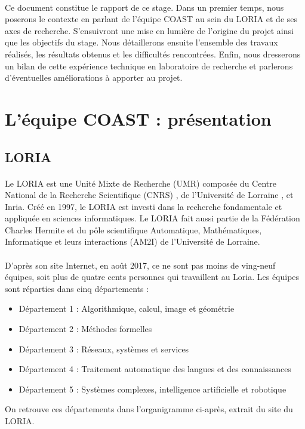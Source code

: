 \documentclass[12pt]{article}
\begin{document}
\paragraph{}
Ce document constitue le rapport de ce stage. Dans un premier temps, nous poserons le contexte en parlant de l'équipe COAST au sein du LORIA et de ses axes de recherche. S'ensuivront une mise en lumière de l'origine du projet ainsi que les objectifs du stage. Nous détaillerons ensuite l'ensemble des travaux réalisés, les résultats obtenus et les difficultés rencontrées. Enfin, nous dresserons un bilan de cette expérience technique en laboratoire de recherche et parlerons d'éventuelles améliorations à apporter au projet.\\

\newpage
\section{L'équipe COAST : présentation}
\subsection{LORIA}
\paragraph{}
Le LORIA est une Unité Mixte de Recherche (UMR) \cite{umr} composée du Centre National de la Recherche Scientifique (CNRS) \cite{cnrs}, de l'Université de Lorraine \cite{univ}, et Inria. Créé en 1997, le LORIA est investi dans la recherche fondamentale et appliquée en sciences informatiques. Le LORIA fait aussi partie de la Fédération Charles Hermite \cite{hermite} et du pôle scientifique Automatique, Mathématiques, Informatique et leurs interactions (AM2I) \cite{am2i} de l'Université de Lorraine.
\paragraph{}
D'après son site Internet, en août 2017, ce ne sont pas moins de ving-neuf équipes, soit plus de quatre cents personnes qui travaillent au Loria. Les équipes sont réparties dans cinq départements :
\begin{itemize}
    \item Département 1 : Algorithmique, calcul, image et géométrie
    \item Département 2 : Méthodes formelles
    \item Département 3 : Réseaux, systèmes et services
    \item Département 4 : Traitement automatique des langues et des connaissances
    \item Département 5 : Systèmes complexes, intelligence artificielle et robotique
\end{itemize}
On retrouve ces départements dans l'organigramme ci-après, extrait du site du LORIA. 
\end{document}
